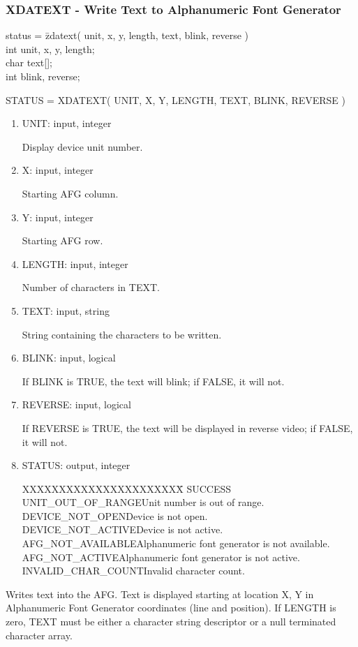 \subsubsection{XDATEXT - Write Text to Alphanumeric Font Generator}
\begin{tabbing}
status = \=zdatext( unit, x, y, length, text, blink, reverse )\\
\>int  unit, x, y, length;\\
\>char  text[];\\
\>int  blink, reverse;\\
\end{tabbing}
STATUS = XDATEXT( UNIT, X, Y, LENGTH, TEXT, BLINK, REVERSE )
\begin{enumerate}
\item UNIT:  input, integer

Display device unit number.
\item X:  input, integer

Starting AFG column.
\item Y:  input, integer

Starting AFG row.
\item LENGTH:  input, integer

Number of characters in TEXT.
\item TEXT:  input, string

String containing the characters to be written.
\item BLINK:  input, logical

If BLINK is TRUE, the text will blink; if FALSE, it will not.
\item REVERSE:  input, logical

If REVERSE is TRUE, the text will be displayed in reverse video; if FALSE, 
it will not.
\item STATUS:  output, integer
\begin{tabbing}
XXXXXXXXXXXXXXXXXXXXXX\=\kill
SUCCESS\\
UNIT\_OUT\_OF\_RANGE\>Unit number is out of range.\\
DEVICE\_NOT\_OPEN\>Device is not open.\\
DEVICE\_NOT\_ACTIVE\>Device is not active.\\
AFG\_NOT\_AVAILABLE\>Alphanumeric font generator is not available.\\
AFG\_NOT\_ACTIVE\>Alphanumeric font generator is not active.\\
INVALID\_CHAR\_COUNT\>Invalid character count.\\
\end{tabbing}
\end{enumerate}
Writes text into the AFG.  Text is displayed starting at location X, Y
in Alphanumeric Font Generator coordinates (line and position).  If
LENGTH is zero, TEXT must be either a character string descriptor
or a null terminated character array.
\newpage
